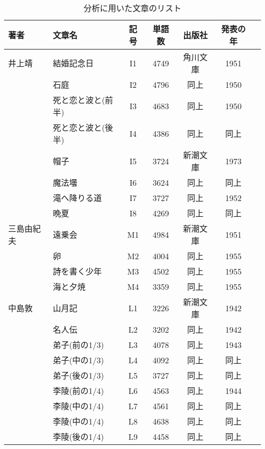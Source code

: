 \begin{table}[htb]
\caption{{\dg 分析に用いた文章のリスト}\label{list}}
\begin{center}
\small{
\begin{tabular}{l l c c c c c }\hline
著者         & 文章名           & 記号&単語数 & 出版社 &発表の年\\ \hline 
井上靖       & 結婚記念日       & I1  &  4749 &角川文庫& 1951 \\
             & 石庭             & I2  &  4796 & 同上   & 1950 \\
             &死と恋と波と(前半)& I3  &  4683 & 同上   & 1950 \\
             &死と恋と波と(後半)& I4  &  4386 & 同上   & 同上\\
             & 帽子             & I5  &  3724 &新潮文庫& 1973 \\
             & 魔法壜           & I6  &  3624 & 同上   & 同上 \\
             & 滝へ降りる道     & I7  &  3727 & 同上   & 1952 \\
             & 晩夏             & I8  &  4269 & 同上   & 同上 \\ 
三島由紀夫   & 遠乗会           & M1  &  4984 &新潮文庫& 1951 \\
             & 卵               & M2  &  4004 & 同上   & 1955 \\
             & 詩を書く少年     & M3  &  4502 & 同上   & 1955 \\
             & 海と夕焼         & M4  &  3359 & 同上   & 1955 \\
中島敦       &山月記            & L1  &  3226 &新潮文庫& 1942 \\
             &名人伝            & L2  &  3202 & 同上   & 1942 \\
             &弟子(前の1/3)     & L3  &  4078 & 同上   & 1943 \\
             &弟子(中の1/3)     & L4  &  4092 & 同上   & 同上 \\
             &弟子(後の1/3)     & L5  &  3727 & 同上   & 同上 \\
             &李陵(前の1/4)     & L6  &  4563 & 同上   & 1944 \\
             &李陵(中の1/4)     & L7  &  4561 & 同上   & 同上\\
             &李陵(中の1/4)     & L8  &  4638 & 同上   & 同上  \\
             &李陵(後の1/4)     & L9  &  4458 & 同上  & 同上\\  \hline
\end{tabular}
}
\end{center}
\end{table}

